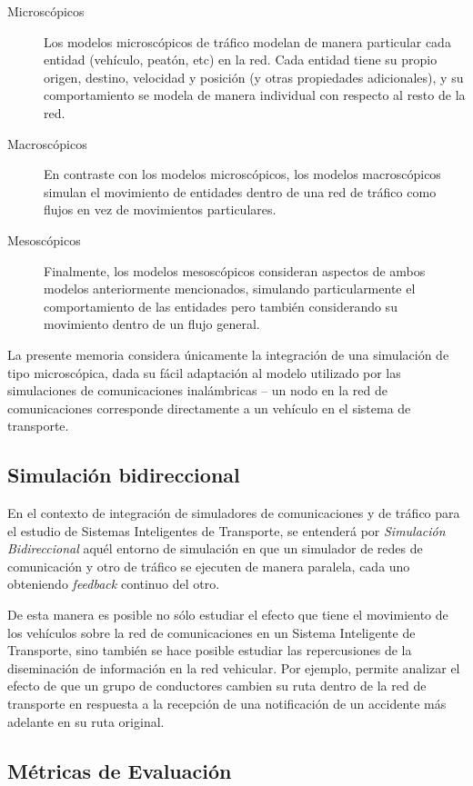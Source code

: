 \begin{description}
    \item[Microscópicos] Los modelos microscópicos de tráfico modelan de manera particular cada entidad (vehículo, peatón, etc) en la red. Cada entidad tiene su propio origen, destino, velocidad y posición (y otras propiedades adicionales), y su comportamiento se modela de manera individual con respecto al resto de la red. 
    \item[Macroscópicos] En contraste con los modelos microscópicos, los modelos macroscópicos simulan el movimiento de entidades dentro de una red de tráfico como flujos en vez de movimientos particulares.
    \item[Mesoscópicos] Finalmente, los modelos mesoscópicos consideran aspectos de ambos modelos anteriormente mencionados, simulando particularmente el comportamiento de las entidades pero también considerando su movimiento dentro de un flujo general.
\end{description}

La presente memoria considera únicamente la integración de una simulación de tipo microscópica, dada su fácil adaptación al modelo utilizado por las simulaciones de comunicaciones inalámbricas -- un nodo en la red de comunicaciones corresponde directamente a un vehículo en el sistema de transporte.

\subsection{Simulación bidireccional}

En el contexto de integración de simuladores de comunicaciones y de tráfico para el estudio de Sistemas Inteligentes de Transporte, se entenderá por \emph{Simulación Bidireccional} aquél entorno de simulación en que un simulador de redes de comunicación y otro de tráfico se ejecuten de manera paralela, cada uno obteniendo \emph{feedback} continuo del otro.

De esta manera es posible no sólo estudiar el efecto que tiene el movimiento de los vehículos sobre la red de comunicaciones en un Sistema Inteligente de Transporte, sino también se hace posible estudiar las repercusiones de la diseminación de información en la red vehicular. Por ejemplo, permite analizar el efecto de que un grupo de conductores cambien su ruta dentro de la red de transporte en respuesta a la recepción de una notificación de un accidente más adelante en su ruta original.

\subsection{Métricas de Evaluación}

